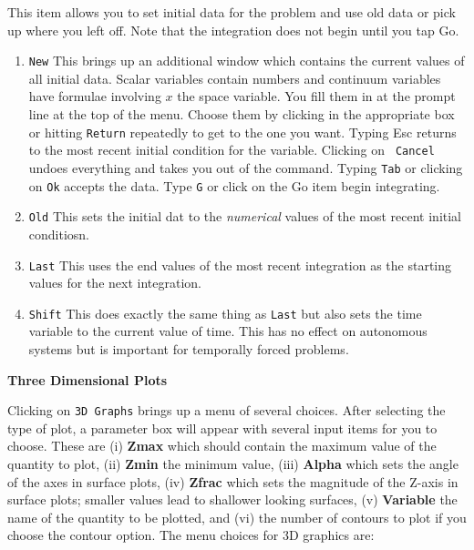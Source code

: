 This item allows you to set initial data for the problem and use old
data or pick up where you left off.  Note that the integration does
not begin until you tap Go. 
\begin{enumerate}
\item {\tt New} This brings up an additional window which contains the
current values of all initial data.  Scalar variables contain numbers
and continuum variables have formulae involving $x$ the space
variable. You fill them in at the prompt line at the top of the menu.
Choose them by clicking in the appropriate box or hitting {\tt Return}
repeatedly to get to the one you want.  Typing {Esc} returns to the
most recent initial condition for the variable.  Clicking on {\tt
Cancel} undoes everything and takes you out of the command. Typing
{\tt Tab} or clicking on {\tt Ok} accepts the data. Type {\tt G} or
click on the Go item begin integrating.
\item {\tt Old} This sets the initial dat to the {\em numerical} values of
the most recent initial conditiosn.
\item {\tt Last} This uses the end values of the most recent
integration as the starting values for the next integration.
\item {\tt Shift}  This does exactly the same thing as {\tt Last} but
also sets the time variable to the current value of time.  This has no
effect on autonomous systems but is important for temporally forced
problems.
\end{enumerate}
\vspace{.25 in}
\begin{center}
{ \bf \large Three Dimensional Plots }
\end{center}
Clicking on {\tt 3D Graphs} brings up a menu of several choices.
After selecting the type of plot, a parameter box will appear with
several input items for you to choose. These are (i) {\bf Zmax} which
should contain the maximum value of the quantity to plot, (ii) {\bf
Zmin} the minimum value, (iii) {\bf Alpha} which sets the angle of the
axes in surface plots, (iv) {\bf Zfrac} which sets the magnitude of
the Z-axis in surface plots; smaller values lead to shallower looking
surfaces, (v) {\bf Variable} the name of the quantity to be plotted,
and (vi) the number of contours to plot if you choose the contour
option.  
The menu choices for 3D graphics are:

